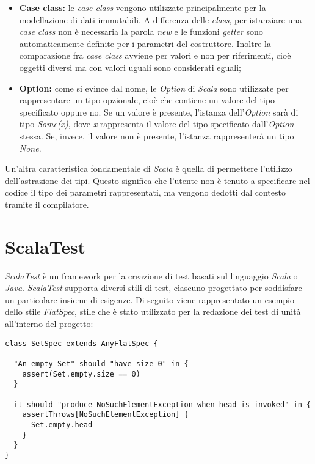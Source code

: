\begin{itemize}
	\item{\textbf{Case class:} le \textit{case class} vengono utilizzate principalmente per la modellazione di dati immutabili. A differenza delle \textit{class}, per istanziare una \textit{case class} non è necessaria la parola \textit{new} e le funzioni \textit{getter} sono automaticamente definite per i parametri del costruttore. Inoltre la comparazione fra \textit{case class} avviene per valori e non per riferimenti, cioè oggetti diversi ma con valori uguali sono considerati eguali;}
	\item{\textbf{Option:} come si evince dal nome, le \textit{Option} di \textit{Scala} sono utilizzate per rappresentare un tipo opzionale, cioè che contiene un valore del tipo specificato oppure no. Se un valore è presente, l'istanza dell'\textit{Option} sarà di tipo \textit{Some(x)}, dove \textit{x} rappresenta il valore del tipo specificato dall'\textit{Option} stessa. Se, invece, il valore non è presente, l'istanza rappresenterà un tipo \textit{None}.}
\end{itemize}
Un'altra caratteristica fondamentale di \textit{Scala} è quella di permettere l'utilizzo dell'astrazione dei tipi. Questo significa che l'utente non è tenuto a specificare nel codice il tipo dei parametri rappresentati, ma vengono dedotti dal contesto tramite il compilatore.



\section{ScalaTest}\label{sec:scala-test}
\textit{ScalaTest} è un \gls{framework} per la creazione di test basati sul linguaggio \textit{Scala} o \textit{Java}. \textit{ScalaTest} supporta diversi stili di test, ciascuno progettato per soddisfare un particolare insieme di esigenze. Di seguito viene rappresentato un esempio dello stile \textit{FlatSpec}, stile che è stato utilizzato per la redazione dei test di unità all'interno del progetto:

\begin{verbatim}
class SetSpec extends AnyFlatSpec {

  "An empty Set" should "have size 0" in {
    assert(Set.empty.size == 0)
  }

  it should "produce NoSuchElementException when head is invoked" in {
    assertThrows[NoSuchElementException] {
      Set.empty.head
    }
  }
}
\end{verbatim}

